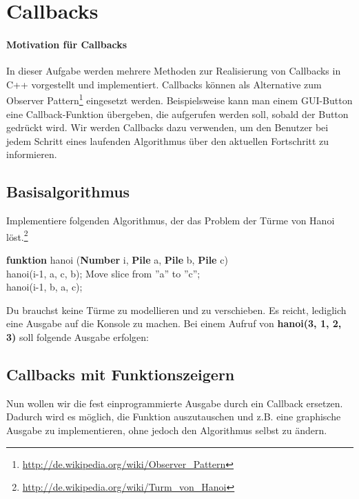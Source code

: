 \section{\ExercisePrefixAdvanced Callbacks}
\label{sec:callbacks}

\paragraph*{Motivation für Callbacks}
In dieser Aufgabe werden mehrere Methoden zur Realisierung von Callbacks in C++ vorgestellt und implementiert.
Callbacks können als Alternative zum Observer Pattern\footnote{\url{http://de.wikipedia.org/wiki/Observer_Pattern}} eingesetzt werden.
Beispielsweise kann man einem GUI-Button eine Callback-Funktion übergeben, die aufgerufen werden soll, sobald der Button gedrückt wird.
Wir werden Callbacks dazu verwenden, um den Benutzer bei jedem Schritt eines laufenden Algorithmus über den aktuellen Fortschritt zu informieren.

\subsection{Basisalgorithmus}
Implementiere folgenden Algorithmus, der das Problem der Türme von Hanoi löst.\footnote{\url{http://de.wikipedia.org/wiki/Turm_von_Hanoi}}\\
\begin{algorithm}[H]
 \SetAlgoLined
 \textbf{funktion} hanoi (\textbf{Number} i, \textbf{Pile} a, \textbf{Pile} b, \textbf{Pile} c) { \\
      {
        hanoi(i-1, a, c, b); 
        Move slice from ''a'' to ''c''; \\
        hanoi(i-1, b, a, c); 
     }
 }
\end{algorithm}

Du brauchst keine Türme zu modellieren und zu verschieben.
Es reicht, lediglich eine Ausgabe auf die Konsole zu machen. 
Bei einem Aufruf von \textbf{hanoi(3, 1, 2, 3)} soll folgende Ausgabe erfolgen:


\subsection{Callbacks mit Funktionszeigern}
Nun wollen wir die fest einprogrammierte Ausgabe durch ein Callback ersetzen. Dadurch wird es möglich, die Funktion auszutauschen und z.B. eine graphische Ausgabe zu implementieren, ohne jedoch den Algorithmus selbst zu ändern.

